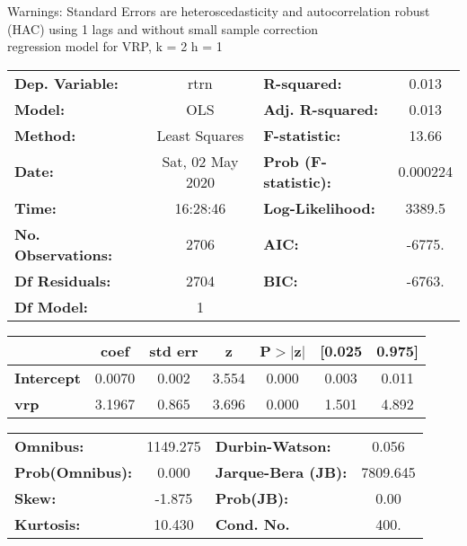 Warnings: \newline
 [1] Standard Errors are heteroscedasticity and autocorrelation robust (HAC) using 1 lags and without small sample correction\\ 

regression model for VRP, k = 2 h = 1\begin{center}
\begin{tabular}{lclc}
\toprule
\textbf{Dep. Variable:}    &       rtrn       & \textbf{  R-squared:         } &     0.013   \\
\textbf{Model:}            &       OLS        & \textbf{  Adj. R-squared:    } &     0.013   \\
\textbf{Method:}           &  Least Squares   & \textbf{  F-statistic:       } &     13.66   \\
\textbf{Date:}             & Sat, 02 May 2020 & \textbf{  Prob (F-statistic):} &  0.000224   \\
\textbf{Time:}             &     16:28:46     & \textbf{  Log-Likelihood:    } &    3389.5   \\
\textbf{No. Observations:} &        2706      & \textbf{  AIC:               } &    -6775.   \\
\textbf{Df Residuals:}     &        2704      & \textbf{  BIC:               } &    -6763.   \\
\textbf{Df Model:}         &           1      & \textbf{                     } &             \\
\bottomrule
\end{tabular}
\begin{tabular}{lcccccc}
                   & \textbf{coef} & \textbf{std err} & \textbf{z} & \textbf{P$> |$z$|$} & \textbf{[0.025} & \textbf{0.975]}  \\
\midrule
\textbf{Intercept} &       0.0070  &        0.002     &     3.554  &         0.000        &        0.003    &        0.011     \\
\textbf{vrp}       &       3.1967  &        0.865     &     3.696  &         0.000        &        1.501    &        4.892     \\
\bottomrule
\end{tabular}
\begin{tabular}{lclc}
\textbf{Omnibus:}       & 1149.275 & \textbf{  Durbin-Watson:     } &    0.056  \\
\textbf{Prob(Omnibus):} &   0.000  & \textbf{  Jarque-Bera (JB):  } & 7809.645  \\
\textbf{Skew:}          &  -1.875  & \textbf{  Prob(JB):          } &     0.00  \\
\textbf{Kurtosis:}      &  10.430  & \textbf{  Cond. No.          } &     400.  \\
\bottomrule
\end{tabular}
\end{center}

